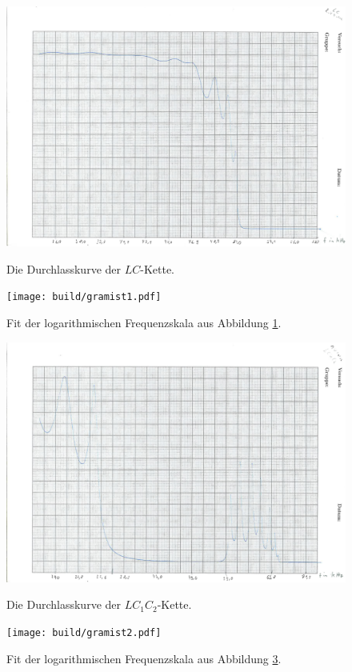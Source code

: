    \begin{figure}
   	\centering
   	\caption{Die Durchlasskurve der $LC$-Kette.}
   	\includegraphics[width=\linewidth-70pt,height=\textheight-70pt,keepaspectratio]{content/Scans/LC.png}
   	\label{fig:Lc}
   \end{figure}
   \begin{figure}
   	\centering
   	\caption{Fit der logarithmischen Frequenzskala aus Abbildung \ref{fig:Lc}.}
   	\texttt{[image: build/gramist1.pdf]}
   	\label{fig:LcMist}
   \end{figure}
	\begin{figure}
		\centering
		\caption{Die Durchlasskurve der $LC_1C_2$-Kette.}
		\includegraphics[width=\linewidth-70pt,height=\textheight-70pt,keepaspectratio]{content/Scans/LC1C2.png}
		\label{fig:Lc1c2}
	\end{figure}
	\begin{figure}
		\centering
		\caption{Fit der logarithmischen Frequenzskala aus Abbildung \ref{fig:Lc1c2}.}
		\texttt{[image: build/gramist2.pdf]}
		\label{fig:Lc1c2Mist}
	\end{figure}
	
